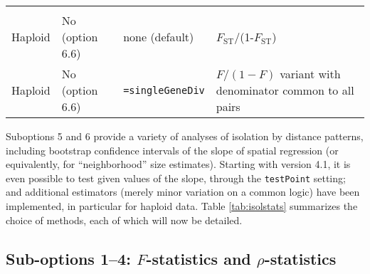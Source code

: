 \documentclass[12pt,]{book}
\begin{document}
\begin{longtable}[]{@{}llll@{}}
\begin{minipage}[t]{0.45\columnwidth}
\end{minipage}\tabularnewline
\begin{minipage}[t]{0.08\columnwidth}\raggedright\strut
Haploid\strut
\end{minipage} & \begin{minipage}[t]{0.16\columnwidth}\raggedright\strut
No (option 6.6)\strut
\end{minipage} & \begin{minipage}[t]{0.19\columnwidth}\raggedright\strut
none (default)\strut
\end{minipage} & \begin{minipage}[t]{0.45\columnwidth}\raggedright\strut
\(F_\mathrm{ST}\)/(1-\(F_\mathrm{ST}\))\strut
\end{minipage}\tabularnewline
\begin{minipage}[t]{0.08\columnwidth}\raggedright\strut
Haploid\strut
\end{minipage} & \begin{minipage}[t]{0.16\columnwidth}\raggedright\strut
No (option 6.6)\strut
\end{minipage} & \begin{minipage}[t]{0.19\columnwidth}\raggedright\strut
\texttt{=singleGeneDiv}\strut
\end{minipage} & \begin{minipage}[t]{0.45\columnwidth}\raggedright\strut
\(F/(1-F)\) variant with denominator common to all pairs\strut
\end{minipage}\tabularnewline
\bottomrule
\end{longtable}

Suboptions 5 and 6 provide a variety of analyses of isolation by
distance patterns, including bootstrap confidence intervals of the slope
of spatial regression (or equivalently, for ``neighborhood'' size
estimates). Starting with version 4.1, it is even possible to test given
values of the slope, through the \texttt{testPoint} setting; and
additional estimators (merely minor variation on a common logic) have
been implemented, in particular for haploid data. Table
\ref{tab:isolstats} summarizes the choice of methods, each of which will
now be detailed.

\subsection{\texorpdfstring{Sub-options 1--4: \(F\)-statistics and
\(\rho\)-statistics}{Sub-options 1--4: F-statistics and \textbackslash{}rho-statistics}}\label{sub-options-14-f-statistics-and-rho-statistics}
\end{document}
